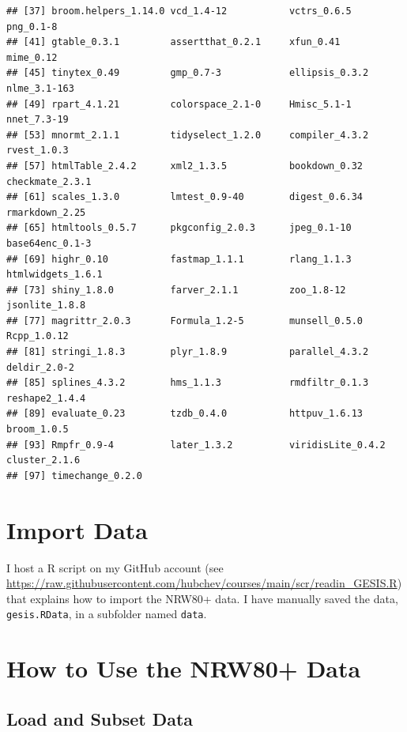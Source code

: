\documentclass[
  doc]{apa6}
\begin{document}
\begin{verbatim}
## [37] broom.helpers_1.14.0 vcd_1.4-12           vctrs_0.6.5          png_0.1-8           
## [41] gtable_0.3.1         assertthat_0.2.1     xfun_0.41            mime_0.12           
## [45] tinytex_0.49         gmp_0.7-3            ellipsis_0.3.2       nlme_3.1-163        
## [49] rpart_4.1.21         colorspace_2.1-0     Hmisc_5.1-1          nnet_7.3-19         
## [53] mnormt_2.1.1         tidyselect_1.2.0     compiler_4.3.2       rvest_1.0.3         
## [57] htmlTable_2.4.2      xml2_1.3.5           bookdown_0.32        checkmate_2.3.1     
## [61] scales_1.3.0         lmtest_0.9-40        digest_0.6.34        rmarkdown_2.25      
## [65] htmltools_0.5.7      pkgconfig_2.0.3      jpeg_0.1-10          base64enc_0.1-3     
## [69] highr_0.10           fastmap_1.1.1        rlang_1.1.3          htmlwidgets_1.6.1   
## [73] shiny_1.8.0          farver_2.1.1         zoo_1.8-12           jsonlite_1.8.8      
## [77] magrittr_2.0.3       Formula_1.2-5        munsell_0.5.0        Rcpp_1.0.12         
## [81] stringi_1.8.3        plyr_1.8.9           parallel_4.3.2       deldir_2.0-2        
## [85] splines_4.3.2        hms_1.1.3            rmdfiltr_0.1.3       reshape2_1.4.4      
## [89] evaluate_0.23        tzdb_0.4.0           httpuv_1.6.13        broom_1.0.5         
## [93] Rmpfr_0.9-4          later_1.3.2          viridisLite_0.4.2    cluster_2.1.6       
## [97] timechange_0.2.0
\end{verbatim}

\hypertarget{import-data}{%
\section{Import Data}\label{import-data}}

I host a R script on my GitHub account (see \url{https://raw.githubusercontent.com/hubchev/courses/main/scr/readin_GESIS.R}) that explains how to import the NRW80+ data. I have manually saved the data, \texttt{gesis.RData}, in a subfolder named \texttt{data}.

\hypertarget{how-to-use-the-nrw80-data}{%
\section{How to Use the NRW80+ Data}\label{how-to-use-the-nrw80-data}}

\hypertarget{sec-load}{%
\subsection{Load and Subset Data}\label{sec-load}}
\end{document}

